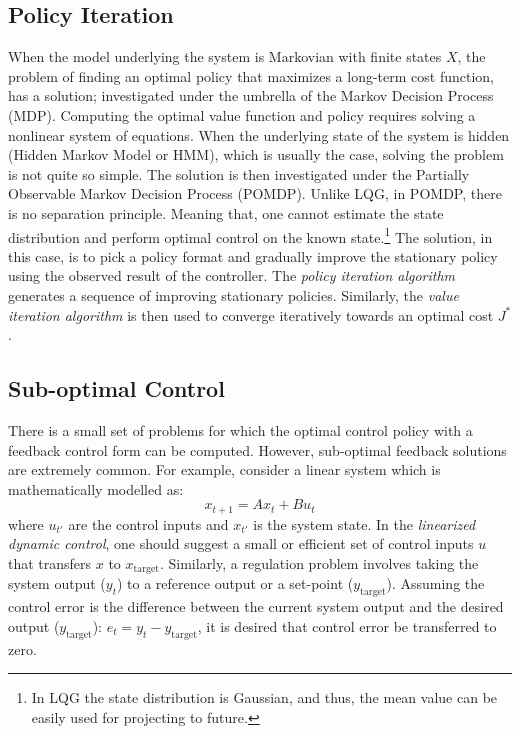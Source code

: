 \subsection{Policy Iteration}  
When the model underlying the system is Markovian with finite states $X$, the problem of finding an optimal policy that maximizes a long-term cost function, has a solution; investigated under the umbrella of the Markov Decision Process (MDP). 
Computing the optimal value function and policy requires solving a nonlinear system of equations. When the underlying state of the system is hidden (Hidden Markov Model or HMM), which is usually the case, solving the problem is not quite so simple. The solution is then investigated under the Partially Observable Markov Decision Process (POMDP). Unlike LQG, in POMDP, there is no separation principle. Meaning that, one cannot estimate the state distribution and perform optimal control on the known state.\footnote{In LQG the state distribution is Gaussian, and thus, the mean value can be easily used for projecting to future.}
 The solution, in this case, is to pick a policy format and gradually improve the stationary policy using the observed result of the controller. The \textit{policy iteration algorithm} generates a sequence of improving stationary policies. Similarly, the \textit{value iteration algorithm} is then used to converge iteratively towards an optimal cost $J^*$. 
 
 \subsection{Sub-optimal Control}
 There is a small set of problems for which the optimal control policy with a feedback control form can be computed.  However, sub-optimal feedback solutions are extremely common. 
  For example, consider a linear system which is mathematically modelled as: 
  \[ x_{t + 1} = Ax_{t} + Bu_{t} \] 
  where $u_{t'}$ are the control inputs and $x_{t'}$ is the system state. 
  In the \textit{linearized dynamic control}, one should suggest a small or efficient set of control inputs $u$ that transfers $x$ to $x_\text{target}$. %
 Similarly, a regulation problem involves taking the system output ($y_t$) to a reference output or a set-point ($y_\text{target}$). Assuming the control error is the difference between the current system output and the desired output ($y_\text{target}$): $e_t=y_t-y_\text{target}$, it is desired that control error be transferred to zero.
        
